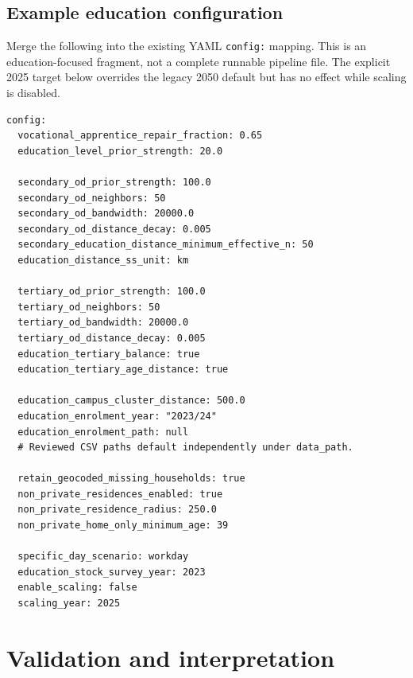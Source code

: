 \documentclass[11pt,a4paper]{article}
\newcommand{\code}[1]{\nolinkurl{#1}}
\begin{document}
\subsection{Example education configuration}

Merge the following into the existing YAML \code{config:} mapping. This is
an education-focused fragment, not a complete runnable pipeline file.
The explicit 2025 target below overrides the legacy 2050 default but has no
effect while scaling is disabled.

\begin{lstlisting}
config:
  vocational_apprentice_repair_fraction: 0.65
  education_level_prior_strength: 20.0

  secondary_od_prior_strength: 100.0
  secondary_od_neighbors: 50
  secondary_od_bandwidth: 20000.0
  secondary_od_distance_decay: 0.005
  secondary_education_distance_minimum_effective_n: 50
  education_distance_ss_unit: km

  tertiary_od_prior_strength: 100.0
  tertiary_od_neighbors: 50
  tertiary_od_bandwidth: 20000.0
  tertiary_od_distance_decay: 0.005
  education_tertiary_balance: true
  education_tertiary_age_distance: true

  education_campus_cluster_distance: 500.0
  education_enrolment_year: "2023/24"
  education_enrolment_path: null
  # Reviewed CSV paths default independently under data_path.

  retain_geocoded_missing_households: true
  non_private_residences_enabled: true
  non_private_residence_radius: 250.0
  non_private_home_only_minimum_age: 39

  specific_day_scenario: workday
  education_stock_survey_year: 2023
  enable_scaling: false
  scaling_year: 2025
\end{lstlisting}

\section{Validation and interpretation}
\end{document}
